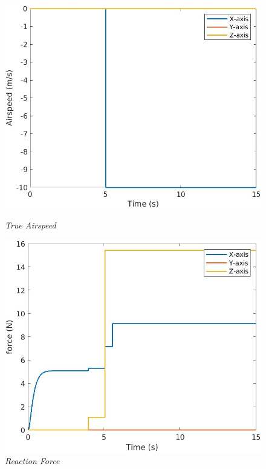 \begin{figure}[htbp]
  \centering
  \begin{minipage}[b]{0.3\textwidth}
    \centering
    \includegraphics[width=\textwidth]{Images/Gust/FIXED/1 airspeed_2.jpg}
    \caption*{\textit{True Airspeed}}
  \end{minipage}
  \hfil
  \begin{minipage}[b]{0.3\textwidth}
    \centering
    \includegraphics[width=\textwidth]{Images/Gust/FIXED/2 force_2.jpg}
    \caption*{\textit{Reaction Force}}
  \end{minipage}

\end{figure}
